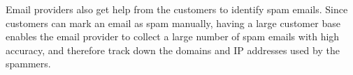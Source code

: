 Email providers also get help from the customers to identify spam emails. Since
customers can mark an email as spam manually, having a large customer base
enables the email provider to collect a large number of spam emails with high
accuracy, and therefore track down the domains and IP addresses used by the 
spammers.
